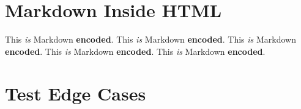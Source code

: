 
\def\mytitle{Markdown in HTML Test}
\def\latexmode{memoir}


\chapter{Markdown Inside HTML}
\label{markdowninsidehtml}
This \emph{is} Markdown \textbf{encoded}.
This \emph{is} Markdown \textbf{encoded}.
This \emph{is} Markdown \textbf{encoded}.
This \emph{is} Markdown \textbf{encoded}.
This \emph{is} Markdown \textbf{encoded}.

\chapter{Test Edge Cases}
\label{testedgecases}




